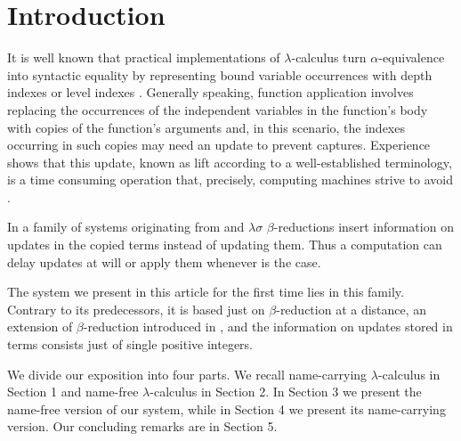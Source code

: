 \section{Introduction}
\label{sec:introduction}

It is well known that practical implementations of $\lambda$-calculus
turn $\alpha$-equivalence into syntactic equality
by representing bound variable occurrences
with depth indexes or level indexes \cite{Bru72}.
Generally speaking, function application involves replacing the
occurrences of the independent variables in the function's body
with copies of the function's arguments
and, in this scenario, the indexes occurring in such copies
may need an update to prevent captures.
Experience shows that this update,
known as lift according to a well-established terminology,
is a time consuming operation \cite[Appendix A2]{lambdadeltaR2a}
that, precisely, computing machines strive to avoid \cite{Klu05}.

In a family of systems originating from \cite{Bru78a}
and $\lambda\sigma$ \cite{ACCL91}
$\beta$-reductions insert information on updates in the copied terms
instead of updating them.
Thus a computation can delay updates at will
or apply them whenever is the case.

The system we present in this article for the first time
lies in this family. Contrary to its predecessors,
it is based just on $\beta$-reduction at a distance,
an extension of $\beta$-reduction introduced in \cite{Ned73},
and the information on updates stored in terms
consists just of single positive integers.

We divide our exposition into four parts.
We recall name-carrying $\lambda$-calculus in Section 1 %
and name-free $\lambda$-calculus in Section 2. %
In Section 3 %
we present the name-free version of our system,
while in Section 4 %
we present its name-carrying version.
Our concluding remarks are in Section 5. %
